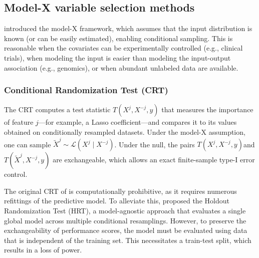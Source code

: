 \documentclass{article}
\theoremstyle{plain}
\theoremstyle{definition}
\theoremstyle{remark}
\begin{document}
\subsection{Model-X variable selection methods}
 \citet{candes2018panning} introduced the model-X framework, which assumes that the input distribution is known (or can be easily estimated), enabling conditional sampling. This is reasonable when the covariates can be experimentally controlled (e.g., clinical trials), when modeling the input is easier than modeling the input-output association (e.g., genomics), or when abundant unlabeled data are available.
\subsubsection{Conditional Randomization Test (CRT)}
The CRT computes a test statistic $T(X^j, X^{-j}, y)$ that measures the importance of feature $j$—for example, a Lasso coefficient—and compares it to its values obtained on conditionally resampled datasets. Under the model-X assumption, one can sample $\widetilde{X}^{j} \sim \mathcal{L}(X^j \mid X^{-j})$. Under the null, the pairs $T(X^j, X^{-j}, y)$and $T(\widetilde{X}^j, X^{-j}, y)$
are exchangeable, which allows an exact finite-sample type-I error control.

The original CRT of \citet{candes2018panning} is computationally prohibitive, as it requires numerous refittings of the predictive model. To alleviate this, \citet{Tansey02012022} proposed the Holdout Randomization Test (HRT), a model-agnostic approach that evaluates a single global model across multiple conditional resamplings. However, to preserve the exchangeability of performance scores, the model must be evaluated using data that is independent of the training set. This necessitates a train-test split, which results in a loss of power.
\end{document}
